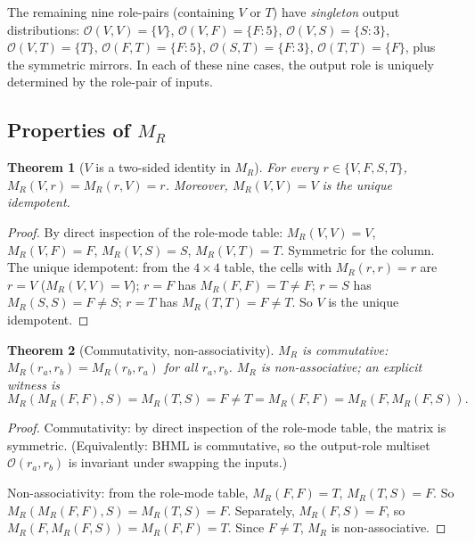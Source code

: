 \documentclass[11pt,reqno]{amsart}
\theoremstyle{plain}
\newtheorem{theorem}{Theorem}[section]
\theoremstyle{definition}
\theoremstyle{remark}
\newcommand{\BH}{\mathrm{BHML}}
\begin{document}
The remaining nine role-pairs (containing $V$ or $T$) have
\emph{singleton} output distributions: $\mathcal{O}(V, V) =
\{V\}$, $\mathcal{O}(V, F) = \{F: 5\}$, $\mathcal{O}(V, S) =
\{S: 3\}$, $\mathcal{O}(V, T) = \{T\}$, $\mathcal{O}(F, T) =
\{F: 5\}$, $\mathcal{O}(S, T) = \{F: 3\}$, $\mathcal{O}(T, T)
= \{F\}$, plus the symmetric mirrors. In each of these nine
cases, the output role is uniquely determined by the role-pair
of inputs.

\subsection{Properties of $M_R$}

\begin{theorem}[$V$ is a two-sided identity in $M_R$]
\label{thm:V-identity}
For every $r \in \{V, F, S, T\}$,
$M_R(V, r) = M_R(r, V) = r$. Moreover,
$M_R(V, V) = V$ is the unique idempotent.
\end{theorem}

\begin{proof}
By direct inspection of the role-mode table: $M_R(V, V) = V$,
$M_R(V, F) = F$, $M_R(V, S) = S$, $M_R(V, T) = T$. Symmetric for
the column. The unique idempotent: from the $4 \times 4$ table,
the cells with $M_R(r, r) = r$ are $r = V$ ($M_R(V, V) = V$);
$r = F$ has $M_R(F, F) = T \neq F$; $r = S$ has $M_R(S, S) = F
\neq S$; $r = T$ has $M_R(T, T) = F \neq T$. So $V$ is the unique
idempotent.
\end{proof}

\begin{theorem}[Commutativity, non-associativity]
\label{thm:role-magma-non-assoc}
$M_R$ is commutative: $M_R(r_a, r_b) = M_R(r_b, r_a)$ for all
$r_a, r_b$. $M_R$ is non-associative; an explicit witness is
\[
  M_R(M_R(F, F), S)
  = M_R(T, S) = F
  \neq T = M_R(F, F) = M_R(F, M_R(F, S)).
\]
\end{theorem}

\begin{proof}
Commutativity: by direct inspection of the role-mode table, the
matrix is symmetric. (Equivalently: $\BH$ is commutative, so the
output-role multiset $\mathcal{O}(r_a, r_b)$ is invariant under
swapping the inputs.)

Non-associativity: from the role-mode table,
$M_R(F, F) = T$, $M_R(T, S) = F$. So
$M_R(M_R(F, F), S) = M_R(T, S) = F$. Separately,
$M_R(F, S) = F$, so $M_R(F, M_R(F, S)) = M_R(F, F) = T$. Since
$F \neq T$, $M_R$ is non-associative.
\end{proof}
\end{document}
